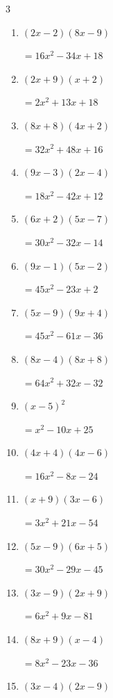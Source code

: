 \begin{multicols}{3}
\begin{enumerate}
        $=15x^{2}+57x+36$

\columnbreak %

  \item $(2x-2)(8x-9)$

        $=16x^{2}-34x+18$

  \item $(2x+9)(x+2)$

        $=2x^{2}+13x+18$

  \item $(8x+8)(4x+2)$

        $=32x^{2}+48x+16$

  \item $(9x-3)(2x-4)$

        $=18x^{2}-42x+12$

  \item $(6x+2)(5x-7)$

        $=30x^{2}-32x-14$

  \item $(9x-1)(5x-2)$

        $=45x^{2}-23x+2$

  \item $(5x-9)(9x+4)$

        $=45x^{2}-61x-36$

  \item $(8x-4)(8x+8)$

        $=64x^{2}+32x-32$

  \item $(x-5)^{2}$

        $=x^{2}-10x+25$

  \item $(4x+4)(4x-6)$

        $=16x^{2}-8x-24$

  \item $(x+9)(3x-6)$

        $=3x^{2}+21x-54$

  \item $(5x-9)(6x+5)$

        $=30x^{2}-29x-45$

  \item $(3x-9)(2x+9)$

        $=6x^{2}+9x-81$

  \item $(8x+9)(x-4)$

        $=8x^{2}-23x-36$

  \item $(3x-4)(2x-9)$


\end{enumerate}
\end{multicols}
